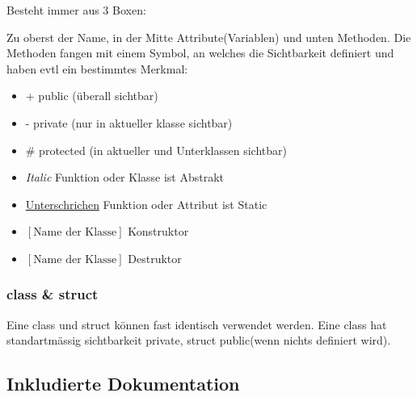 Besteht immer aus 3 Boxen:\\
\noindent
\begin{minipage}{0.6\columnwidth}
\begin{center}
\end{center}
\end{minipage}
\begin{minipage}{0.4\columnwidth}
    Zu oberst der Name, in der Mitte Attribute(Variablen) und unten Methoden.
    Die Methoden fangen mit einem Symbol, an welches die Sichtbarkeit definiert und haben evtl ein bestimmtes Merkmal:

\end{minipage}

\begin{itemize}[itemsep=1pt, parsep=0pt]
    \item + public (überall sichtbar)
    \item - private (nur in  aktueller klasse sichtbar)
    \item \# protected (in aktueller und Unterklassen sichtbar)
    \item \textit{Italic} Funktion oder Klasse ist Abstrakt
    \item \underline{Unterschrichen} Funktion oder Attribut ist Static
    \item $[\text{Name der Klasse}]$ Konstruktor
    \item \texttildelow$[\text{Name der Klasse}]$ Destruktor
\end{itemize}



\subsubsection{class \& struct}

Eine class und struct können fast identisch verwendet werden. 
Eine class hat standartmässig sichtbarkeit private, struct public(wenn nichts definiert wird).


\subsection{Inkludierte Dokumentation}


